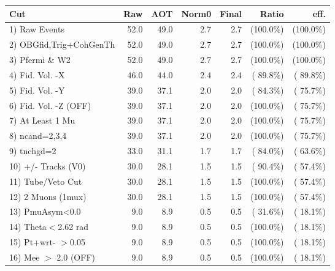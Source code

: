  \begin{table}[h!]\centering
 \begin{tabular}{||l||r|r|r|r|r|r||}
 \hline
 \hline
 Cut & Raw & AOT & Norm0 & Final & Ratio & eff.       \\
 \hline
  1) Raw Events           &         52.0 &         49.0 &          2.7 &          2.7 & (100.0\%) & (100.0\%) \\
  2) OBGfid,Trig+CohGenTh &         52.0 &         49.0 &          2.7 &          2.7 & (100.0\%) & (100.0\%) \\
  3) Pfermi \& W2         &         52.0 &         49.0 &          2.7 &          2.7 & (100.0\%) & (100.0\%) \\
  4) Fid. Vol. -X         &         46.0 &         44.0 &          2.4 &          2.4 & ( 89.8\%) & ( 89.8\%) \\
  5) Fid. Vol. -Y         &         39.0 &         37.1 &          2.0 &          2.0 & ( 84.3\%) & ( 75.7\%) \\
  6) Fid. Vol. -Z (OFF)   &         39.0 &         37.1 &          2.0 &          2.0 & (100.0\%) & ( 75.7\%) \\
  7) At Least 1 Mu        &         39.0 &         37.1 &          2.0 &          2.0 & (100.0\%) & ( 75.7\%) \\
  8) ncand=2,3,4          &         39.0 &         37.1 &          2.0 &          2.0 & (100.0\%) & ( 75.7\%) \\
  9) tnchgd=2             &         33.0 &         31.1 &          1.7 &          1.7 & ( 84.0\%) & ( 63.6\%) \\
 10) +/- Tracks (V0)      &         30.0 &         28.1 &          1.5 &          1.5 & ( 90.4\%) & ( 57.4\%) \\
 11) Tube/Veto Cut        &         30.0 &         28.1 &          1.5 &          1.5 & (100.0\%) & ( 57.4\%) \\
 12) 2 Muons (1mux)       &         30.0 &         28.1 &          1.5 &          1.5 & (100.0\%) & ( 57.4\%) \\
 13) PmuAsym<0.0          &          9.0 &          8.9 &          0.5 &          0.5 & ( 31.6\%) & ( 18.1\%) \\
 14) Theta$<$2.62 rad     &          9.0 &          8.9 &          0.5 &          0.5 & (100.0\%) & ( 18.1\%) \\
 15) Pt+wrt- $>$0.05      &          9.0 &          8.9 &          0.5 &          0.5 & (100.0\%) & ( 18.1\%) \\
 16) Mee $>$ 2.0  (OFF)   &          9.0 &          8.9 &          0.5 &          0.5 & (100.0\%) & ( 18.1\%) \\

\end{tabular}
\end{table}

